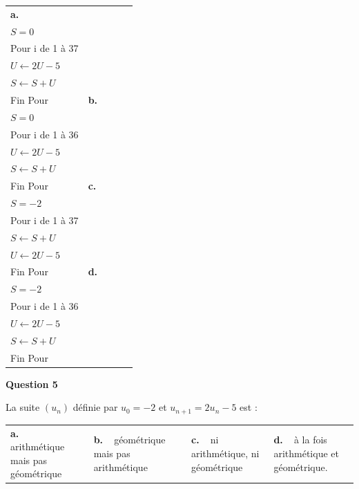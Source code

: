 \documentclass[10pt]{article}
\begin{document}
\vspace{0.5cm}
\begin{tabularx}{\linewidth}{*{4}{X}}

\textbf{a.~~} 
\begin{minipage}[t]{2.9cm}
$U=-2$\\
$S=0$\\
Pour i de 1 à 37\\
$U \leftarrow 2U-5$\\
$S\leftarrow  S+U$\\
Fin Pour 
\end{minipage}
&

\textbf{b.~~}
 \begin{minipage}[t]{2.9cm}
$U=-2$\\
$S=0$\\
Pour i de 1 à 36\\
$U \leftarrow 2U-5$\\
$S \leftarrow  S+U$\\
Fin Pour
\end{minipage}
&

\textbf{c.~~}
 \begin{minipage}[t]{2.9cm}
$U=-2$\\
$S=-2$\\
Pour i de 1 à 37\\
$S \leftarrow  S+U$\\
$U \leftarrow 2U-5$\\
Fin Pour
\end{minipage}
&

\textbf{d.~~} 
\begin{minipage}[t]{2.9cm}
$U=-2$\\
$S=-2$\\
Pour i de 1 à 36\\
$U\leftarrow 2U-5$\\
$S \leftarrow S+U$\\
Fin Pour
\end{minipage}

\end{tabularx}

\medskip

\textbf{Question 5}

\medskip 


La suite $\left(u_n\right)$ définie par $u_0 =-2$ et $u_{n+1} = 2u_n - 5$ est :

\begin{center}
\begin{tabularx}{\linewidth}{*{4}{X}}
\textbf{a.~~} arithmétique mais pas géométrique &\textbf{b.~~}géométrique mais pas arithmétique &\textbf{c.~~}ni arithmétique, ni géométrique& \textbf{d.~~}à la fois arithmétique et géométrique.
\end{tabularx}
\end{center}

\vspace{0,5cm}
\end{document}
